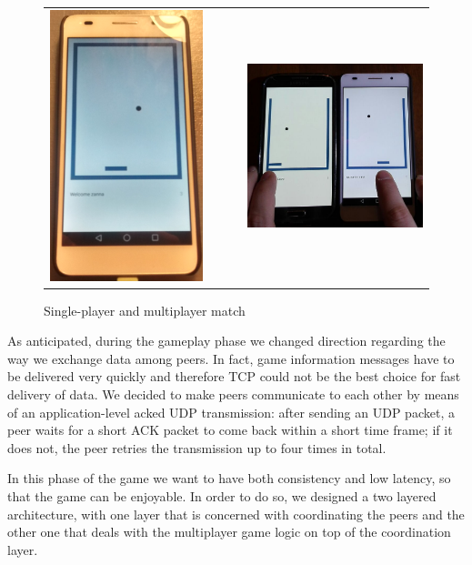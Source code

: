 \begin{figure}[H]
  \centering
  \begin{tabular}{@{}c@{}c@{}c}
      \includegraphics[width=.3\columnwidth]{img/singleplayer}
    \label{fig:singleplayer}
    &
    \mbox{\ \ \ }
    &
      \includegraphics[width=.5\columnwidth]{img/multiplayer}
      \label{fig:multiplayer}
  \end{tabular}
    \caption{Single-player and multiplayer match}
\end{figure}

As anticipated, during the gameplay phase we changed direction regarding the
way we exchange data among peers. In fact, game information messages have to
be delivered very quickly and therefore TCP could not be the best choice for
fast delivery of data. We decided to make peers communicate to each other by
means of an application-level acked UDP transmission: after sending an UDP
packet, a peer waits for a short ACK packet to come back within a short time
frame; if it does not, the peer retries the transmission up to four times in
total.

In this phase of the game we want to have both consistency and low latency, so
that the game can be enjoyable. In order to do so, we designed a two layered
architecture, with one layer that is concerned with coordinating the peers and
the other one that deals with the multiplayer game logic on top of the
coordination layer.

